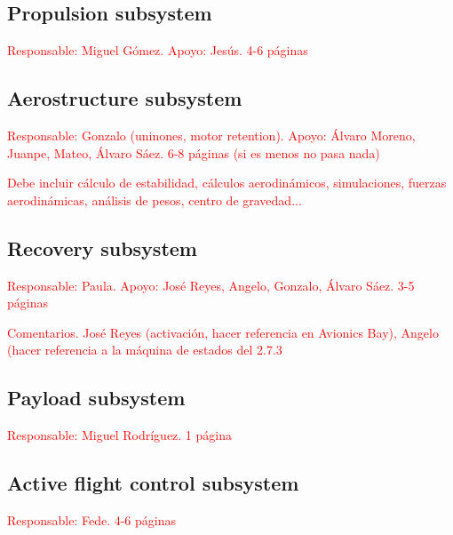 \documentclass[11pt, a4paper]{article} %
\begin{document}
\subsection{Propulsion subsystem}  \textcolor{red}{Responsable: Miguel Gómez. Apoyo: Jesús. 4-6 páginas}

\subsection{Aerostructure subsystem}  \textcolor{red}{Responsable: Gonzalo (uninones, motor retention). Apoyo: Álvaro Moreno, Juanpe, Mateo, Álvaro Sáez. 6-8 páginas (si es menos no pasa nada)} 

\vspace{1cm}

\textcolor{red}{Debe incluir cálculo de estabilidad, cálculos aerodinámicos, simulaciones, fuerzas aerodinámicas, análisis de pesos, centro de gravedad...}

\subsection{Recovery subsystem}  \textcolor{red}{Responsable: Paula. Apoyo: José Reyes, Angelo, Gonzalo, Álvaro Sáez. 3-5 páginas}
\vspace{1cm}

\textcolor{red}{Comentarios. José Reyes (activación, hacer referencia en Avionics Bay), Angelo (hacer referencia a la máquina de estados del 2.7.3}

\subsection{Payload subsystem}  \textcolor{red}{Responsable: Miguel Rodríguez. 1 página }

\subsection{Active flight control subsystem}  \textcolor{red}{Responsable: Fede. 4-6 páginas }
\end{document}
